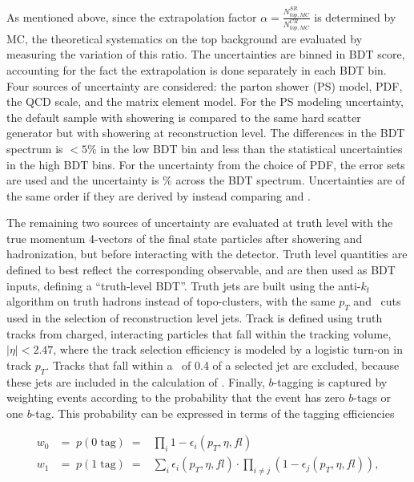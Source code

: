 As mentioned above, since the extrapolation factor $\alpha
= \frac{N_{top,MC}^{SR}}{N_{top,MC}^{CR}}$ is determined by MC, the
theoretical systematics on the top background are evaluated by
measuring the variation of this ratio. The uncertainties are binned in
BDT score, accounting for the fact the extrapolation is done
separately in each BDT bin. Four sources of uncertainty
are considered: the parton shower (PS) model, PDF, the QCD scale, and
the matrix element model. For the PS modeling uncertainty, the default
sample with \PYTHIA showering is compared to the same hard scatter
generator but with \HERWIG showering at reconstruction
level. The differences in the BDT spectrum is $<5\%$ in the low BDT
bin and less than the statistical uncertainties in the high BDT
bins. For the uncertainty from the choice of PDF, the \ctten error sets
are used and the uncertainty is \% across the BDT
spectrum. Uncertainties are of the same order if they are derived by
instead comparing \ctten and \nnpdf. 

The remaining two sources of uncertainty are evaluated at truth
level with the true momentum 4-vectors of the final state particles
after showering and hadronization, but before interacting with the
detector. Truth level quantities are defined to best reflect the
corresponding observable, and are then used as BDT inputs, defining a
``truth-level BDT''. Truth jets are built using the anti-$k_t$
algorithm on truth hadrons instead of topo-clusters, with the same
$p_T$ and \eta~cuts used in the selection of reconstruction level jets. Track \etmiss is
defined using truth tracks from charged, interacting particles that
fall within the tracking volume, $|\eta|<2.47$, where the track selection
efficiency is modeled by a logistic turn-on in track $p_T$. Tracks
that fall within a \dR~of 0.4 of a selected jet are excluded, because
these jets are included in the calculation of \etmiss. Finally,
$b$-tagging is captured by weighting events according to the
probability that the event has zero $b$-tags or one $b$-tag. This
probability can be expressed in terms of the tagging efficiencies

\begin{eqnarray}
        w_{0} &=\; p(0\; \textrm{tag})\; =& \prod_{i} 1
        - \epsilon_{i}(p_T,\eta,fl)  \\
        w_{1} &=\; p(1\; \textrm{tag})\;
        =& \sum_{i} \epsilon_{i}(p_T,\eta,fl) \cdot \prod_{i \neq j}
        (1 - \epsilon_{j}(p_T,\eta,fl)),
\label{chap:analysis:eq:btag_formula}
\end{eqnarray}

